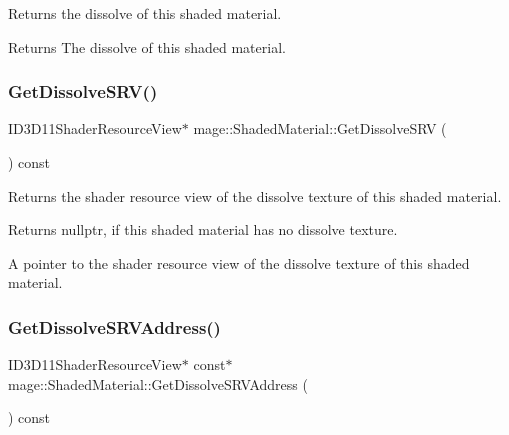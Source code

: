 Returns the dissolve of this shaded material.

\begin{DoxyReturn}{Returns}
The dissolve of this shaded material. 
\end{DoxyReturn}
\hypertarget{structmage_1_1_shaded_material_ac74d2e8849300aa1e54cbce0bf8cbeff}{}\label{structmage_1_1_shaded_material_ac74d2e8849300aa1e54cbce0bf8cbeff} 
\subsubsection{\texorpdfstring{Get\+Dissolve\+S\+R\+V()}{GetDissolveSRV()}}
{\footnotesize\ttfamily I\+D3\+D11\+Shader\+Resource\+View$\ast$ mage\+::\+Shaded\+Material\+::\+Get\+Dissolve\+S\+RV (\begin{DoxyParamCaption}{ }\end{DoxyParamCaption}) const\hspace{0.3cm}{\ttfamily [noexcept]}}

Returns the shader resource view of the dissolve texture of this shaded material.

\begin{DoxyReturn}{Returns}
{\ttfamily nullptr}, if this shaded material has no dissolve texture. 

A pointer to the shader resource view of the dissolve texture of this shaded material. 
\end{DoxyReturn}
\hypertarget{structmage_1_1_shaded_material_aa114be8c5d55096554cf75fdba75ab2d}{}\label{structmage_1_1_shaded_material_aa114be8c5d55096554cf75fdba75ab2d} 
\subsubsection{\texorpdfstring{Get\+Dissolve\+S\+R\+V\+Address()}{GetDissolveSRVAddress()}}
{\footnotesize\ttfamily I\+D3\+D11\+Shader\+Resource\+View$\ast$ const$\ast$ mage\+::\+Shaded\+Material\+::\+Get\+Dissolve\+S\+R\+V\+Address (\begin{DoxyParamCaption}{ }\end{DoxyParamCaption}) const\hspace{0.3cm}{\ttfamily [noexcept]}}

